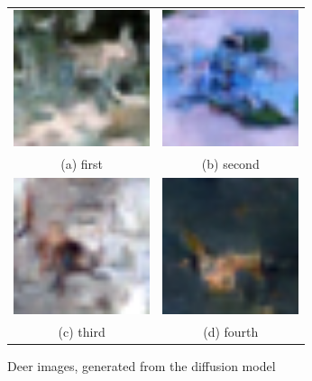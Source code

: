 \documentclass[conference]{IEEEtran}
\begin{document}
      \begin{figure}
        \begin{tabular}{cc}
          \includegraphics[width=40mm]{./images/generated-imgs/deer/0408.png} 
      &   \includegraphics[width=40mm]{./images/generated-imgs/deer/0409.png} 
      \\
        (a) first 
        & (b) second \\[6pt]
           \includegraphics[width=40mm]{./images/generated-imgs/deer/0410.png} 
        &  \includegraphics[width=40mm]{./images/generated-imgs/deer/0411.png} 
      \\
        (c) third & (d) fourth \\[6pt]
        \end{tabular}
        \caption{Deer images, generated from the diffusion model}
        \end{figure}
    
\end{document}
